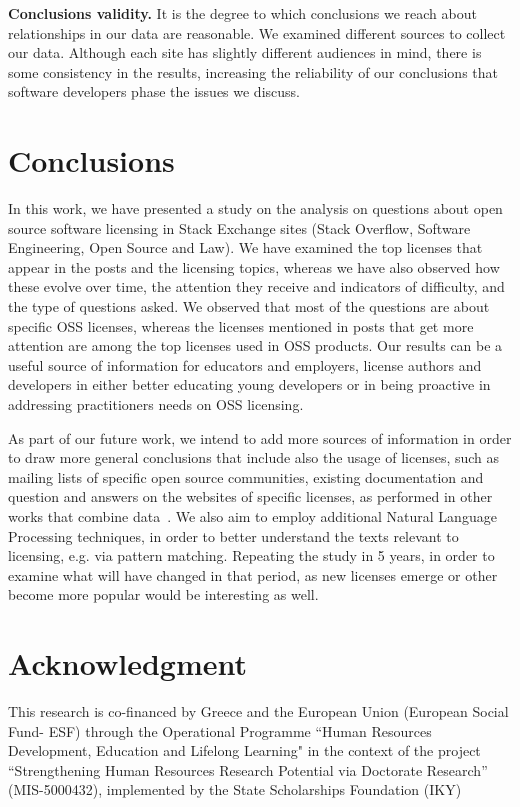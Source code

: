 \documentclass{elsarticle}
\begin{document}
\textbf{Conclusions validity.} It is the degree to which conclusions we reach about relationships in our data are reasonable. We examined different sources to collect our data. Although each site has slightly different audiences in mind, there is some consistency in the results, increasing the reliability of our conclusions that software developers phase the issues we discuss.

\section{Conclusions}

In this work, we have presented a study on the analysis on questions about open source software licensing in Stack Exchange sites (Stack Overflow, Software Engineering, Open Source and Law). We have examined the top licenses that appear in the posts and the licensing topics, whereas we have also observed how these evolve over time, the attention they receive and indicators of difficulty, and the type of questions asked. We observed that most of the questions are about specific OSS licenses, whereas the licenses mentioned in posts that get more attention are among the top licenses used in OSS products. Our results can be a useful source of information for educators and employers, license authors and developers in either better educating young developers or in being proactive in addressing practitioners needs on OSS licensing. 

As part of our future work, we intend to add more sources of information in order to draw more general conclusions that include also the usage of licenses, such as mailing lists of specific open source communities, existing documentation and question and answers on the websites of specific licenses, as performed in other works that combine data~\cite{zagalsky2018r}. We also aim to employ additional Natural Language Processing techniques, in order to better understand the texts relevant to licensing, e.g. via pattern matching. Repeating the study in 5 years, in order to examine what will have changed in that period, as new licenses emerge or other become more popular would be interesting as well.

\section*{Acknowledgment}
This research is co-financed by Greece and the European Union (European Social Fund- ESF) through the Operational Programme ``Human Resources Development, Education and Lifelong Learning" in the context of the project “Strengthening Human Resources Research Potential via Doctorate Research” (MIS-5000432), implemented by the State Scholarships Foundation (IKY)

% 

\end{document}
